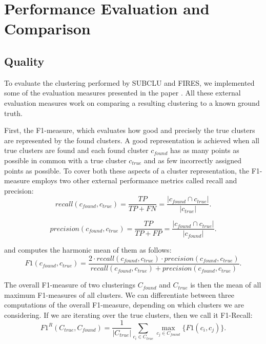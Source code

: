\section{Performance Evaluation and Comparison}\raggedbottom

\subsection{Quality}
To evaluate the clustering performed by SUBCLU and FIRES, we implemented some of the evaluation measures presented in the paper \citep{10.1145/2063576.2063774}. All these external evaluation measures work on comparing a resulting clustering to a known ground truth.

First, the F1-measure, which evaluates how good and precisely the true clusters are represented by the found clusters. A good representation is achieved when all true clusters are found and each found cluster $c_{found}$ has as many points as possible in common with a true cluster $c_{true}$ and as few incorrectly assigned points as possible. To cover both these aspects of a cluster representation, the F1-measure employs two other external performance metrics called recall and precision:
\begin{equation}
recall(c_{found},c_{true}) = \frac{TP}{TP + FN} = \frac{|c_{found} \cap c_{true}|}{|c_{true}|}.
\end{equation}

\begin{equation}
precision(c_{found},c_{true}) = \frac{TP}{TP + FP} = \frac{|c_{found} \cap c_{true}|}{|c_{found}|}.
\end{equation}

and computes the harmonic mean of them as follows:
\begin{equation}
F1(c_{found},c_{true}) = \frac{2\cdot recall(c_{found},c_{true})\cdot precision(c_{found},c_{true})}{recall(c_{found},c_{true}) + precision(c_{found},c_{true})}.
\end{equation}

The overall F1-measure of two clusterings $C_{found}$ and $C_{true}$ is then the mean of all maximum F1-measures of all clusters. We can differentiate between three computations of the overall F1-measure, depending on which clusters we are considering. If we are iterating over the true clusters, then we call it F1-Recall:
\begin{equation}
F1^{R}(C_{true},C_{found}) = \frac{1}{|C_{true}|} \sum _{c_{i}\in C_{true}} \max _{c_{j}\in C_{found}} \{F1(c_{i},c_{j})\}.
\end{equation}

